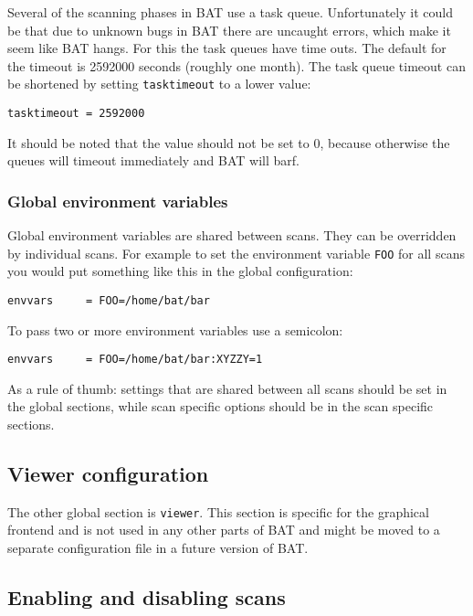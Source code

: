 \documentclass[10pt,a4paper]{article}
\begin{document}
Several of the scanning phases in BAT use a task queue. Unfortunately it could
be that due to unknown bugs in BAT there are uncaught errors, which make it
seem like BAT hangs. For this the task queues have time outs. The default for
the timeout is 2592000 seconds (roughly one month). The task queue timeout can
be shortened by setting \texttt{tasktimeout} to a lower value:

\begin{verbatim}
tasktimeout = 2592000
\end{verbatim}

It should be noted that the value should not be set to 0, because otherwise
the queues will timeout immediately and BAT will barf.

\subsubsection{Global environment variables}

Global environment variables are shared between scans. They can be overridden
by individual scans. For example to set the environment variable \texttt{FOO}
for all scans you would put something like this in the global configuration:

\begin{verbatim}
envvars     = FOO=/home/bat/bar
\end{verbatim}

To pass two or more environment variables use a semicolon:

\begin{verbatim}
envvars     = FOO=/home/bat/bar:XYZZY=1
\end{verbatim}

As a rule of thumb: settings that are shared between all scans should be set in
the global sections, while scan specific options should be in the scan
specific sections.

\subsection{Viewer configuration}

The other global section is \texttt{viewer}. This section is specific for the
graphical frontend and is not used in any other parts of BAT and might be moved
to a separate configuration file in a future version of BAT.

\subsection{Enabling and disabling scans}
\end{document}
